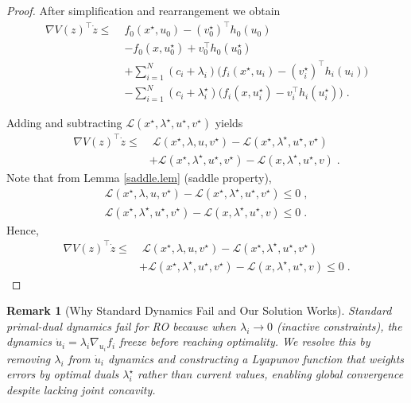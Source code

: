 \documentclass[journal,twoside,web]{ieeecolor}
\newcommand{\rev}[1]{\textcolor{revisionblue}{#1}}
\newtheorem{remark}{Remark}
\begin{document}
\begin{proof}
After simplification and rearrangement we obtain
\begin{align*}
\nabla V(z)^\top \dot z\leq \; & f_0(x^\star,u_0)-(v_0^\star)^\top
h_0(u_0)\\
&-f_0(x,u_0^\star)+v_0^\top h_0(u_0^\star)\\
&+\sum_{i=1}^N(c_i+\lambda_i) \Big(f_i(x^\star,u_i)-(v_i^\star)^\top h_i(u_i)\Big)\\
&-\sum_{i=1}^N(c_i+\lambda_i^\star) \Big(f_i(x,u_i^\star)-v_i^\top h_i(u_i^\star)\Big)\;.
\end{align*}

Adding and subtracting $\mathcal{L}(x^\star,\lambda^\star,u^\star,v^\star)$ yields
\begin{align} \label{deriv_v}
\nabla V(z)^\top \dot z\leq&\; \mathcal{L}(x^\star,\lambda,u,v^\star)-\mathcal{L}(x^\star,\lambda^\star,u^\star,v^\star)\\
&+\mathcal{L}(x^\star,\lambda^\star,u^\star,v^\star)-\mathcal{L}(x,\lambda^\star,u^\star,v) \;.\nonumber
\end{align}
Note that from Lemma \ref{saddle.lem} (saddle property),
\begin{align*}\mathcal{L}(x^\star,\lambda,u,v^\star)-\mathcal{L}(x^\star,\lambda^\star,u^\star,v^\star)\leq 0\;,
\\
\mathcal{L}(x^\star,\lambda^\star,u^\star,v^\star)-\mathcal{L}(x,\lambda^\star,u^\star,v)\leq 0\;.
\end{align*}
Hence,
\begin{align} \label{deriv_v2}
\nabla V(z)^\top \dot z\leq&\; \mathcal{L}(x^\star,\lambda,u,v^\star)-\mathcal{L}(x^\star,\lambda^\star,u^\star,v^\star)\\
&+\mathcal{L}(x^\star,\lambda^\star,u^\star,v^\star)-\mathcal{L}(x,\lambda^\star,u^\star,v)\leq 0 \;.\nonumber
\end{align}
\end{proof}

\begin{remark}[\rev{Why Standard Dynamics Fail and Our Solution Works}] \label{remark_reader_notice}
\rev{Standard primal-dual dynamics fail for RO because when $\lambda_i \to 0$ (inactive constraints), the dynamics $\dot{u}_i = \lambda_i \nabla_{u_i} f_i$ freeze before reaching optimality. We resolve this by removing $\lambda_i$ from $\dot{u}_i$ dynamics and constructing a Lyapunov function that weights errors by optimal duals $\lambda_i^\star$ rather than current values, enabling global convergence despite lacking joint concavity.}
\end{remark}
\end{document}
